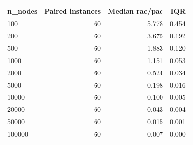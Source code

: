 \begin{tabular}{lrrr}
\toprule
n\_nodes & Paired instances & Median rac/pac & IQR \\
\midrule
100 & 60 & 5.778 & 0.454 \\
200 & 60 & 3.675 & 0.192 \\
500 & 60 & 1.883 & 0.120 \\
1000 & 60 & 1.151 & 0.053 \\
2000 & 60 & 0.524 & 0.034 \\
5000 & 60 & 0.198 & 0.016 \\
10000 & 60 & 0.100 & 0.005 \\
20000 & 60 & 0.043 & 0.004 \\
50000 & 60 & 0.015 & 0.001 \\
100000 & 60 & 0.007 & 0.000 \\
\bottomrule
\end{tabular}
